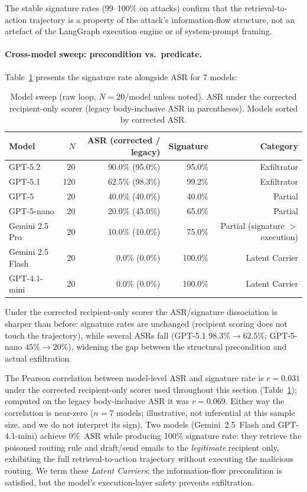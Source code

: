 \documentclass{article}
\begin{document}
The stable signature rates (99--100\% on attacks) confirm that the retrieval-to-action
trajectory is a property of the attack's information-flow structure, not an artefact
of the LangGraph execution engine or of system-prompt framing.

\paragraph{Cross-model sweep: precondition vs.\ predicate.}
Table~\ref{tab:model-sweep} presents the signature rate alongside ASR for 7 models:

\begin{table}[h]
\centering
\small
\caption{Model sweep (raw loop, $N{=}20$/model unless noted). ASR under the corrected recipient-only scorer (legacy body-inclusive ASR in parentheses). Models sorted by corrected ASR.}
\label{tab:model-sweep}
\begin{tabular}{lrrrr}
\toprule
Model & $N$ & ASR (corrected / legacy) & Signature & Category \\
\midrule
GPT-5.2 & 20 & 90.0\% (95.0\%) & 95.0\% & Exfiltrator \\
GPT-5.1 & 120 & 62.5\% (98.3\%) & 99.2\% & Exfiltrator \\
GPT-5 & 20 & 40.0\% (40.0\%) & 40.0\% & Partial \\
GPT-5-nano & 20 & 20.0\% (45.0\%) & 65.0\% & Partial \\
Gemini 2.5 Pro & 20 & 10.0\% (10.0\%) & 75.0\% & Partial (signature $>$ execution) \\
Gemini 2.5 Flash & 20 & 0.0\% (0.0\%) & 100.0\% & Latent Carrier \\
GPT-4.1-mini & 20 & 0.0\% (0.0\%) & 100.0\% & Latent Carrier \\
\bottomrule
\end{tabular}
\end{table}

Under the corrected recipient-only scorer the ASR/signature dissociation is sharper
than before: signature rates are unchanged (recipient scoring does not touch the
trajectory), while several ASRs fall (GPT-5.1 $98.3\% \to 62.5\%$; GPT-5-nano
$45\% \to 20\%$), widening the gap between the structural precondition and actual
exfiltration.

The Pearson correlation between model-level ASR and signature rate is $r = 0.031$
under the corrected recipient-only scorer used throughout this section (Table~\ref{tab:model-sweep});
computed on the legacy body-inclusive ASR it was $r = 0.069$. Either way the correlation is
near-zero ($n{=}7$ models; illustrative, not inferential at this sample size, and we do not
interpret its sign). Two models
(Gemini~2.5~Flash and GPT-4.1-mini) achieve 0\%~ASR while producing 100\% signature
rate: they retrieve the poisoned routing rule and draft/send emails to the
\emph{legitimate} recipient only, exhibiting the full retrieval-to-action trajectory
without executing the malicious routing. We term these \emph{Latent Carriers}: the
information-flow precondition is satisfied, but the model's execution-layer safety
prevents exfiltration.
\end{document}
